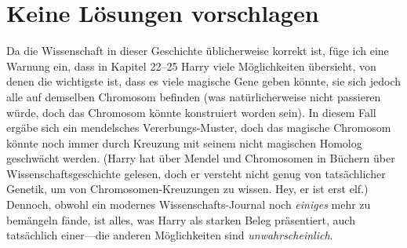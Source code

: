 \chapter{Keine Lösungen vorschlagen}

\begin{chapterOpeningAuthorNote}
Da die Wissenschaft in dieser Geschichte üblicherweise korrekt ist, füge ich eine Warnung ein, dass in Kapitel 22–25 Harry viele Möglichkeiten übersieht, von denen die wichtigste ist, dass es viele magische Gene geben könnte, sie sich jedoch alle auf demselben Chromosom befinden (was natürlicherweise nicht passieren würde, doch das Chromosom könnte konstruiert worden sein). In diesem Fall ergäbe sich ein mendelsches Vererbungs-Muster, doch das magische Chromosom könnte noch immer durch Kreuzung mit seinem nicht magischen Homolog geschwächt werden. (Harry hat über Mendel und Chromosomen in Büchern über Wissenschaftsgeschichte gelesen, doch er versteht nicht genug von tatsächlicher Genetik, um von Chromosomen-Kreuzungen zu wissen. Hey, er ist erst elf.) Dennoch, obwohl ein modernes Wissenschafts-Journal noch \emph{einiges} mehr zu bemängeln fände, ist alles, was Harry als starken Beleg präsentiert, auch tatsächlich einer—die anderen Möglichkeiten sind \emph{unwahrscheinlich}.%
\end{chapterOpeningAuthorNote}

